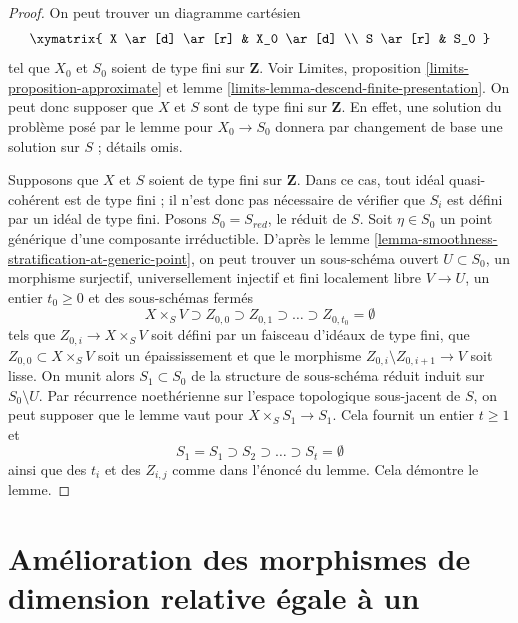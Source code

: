 \begin{proof}
On peut trouver un diagramme cartésien
$$
\xymatrix{
X \ar[d] \ar[r] & X_0 \ar[d] \\
S \ar[r] & S_0
}
$$
tel que $X_0$ et $S_0$ soient de type fini sur $\mathbf{Z}$. Voir
Limites, proposition \ref{limits-proposition-approximate} et
lemme \ref{limits-lemma-descend-finite-presentation}.
On peut donc supposer que $X$ et $S$ sont de type fini sur $\mathbf{Z}$.
En effet, une solution du problème posé par le lemme pour $X_0 \to S_0$
donnera par changement de base une solution sur $S$ ; détails omis.

\medskip\noindent
Supposons que $X$ et $S$ soient de type fini sur $\mathbf{Z}$.
Dans ce cas, tout idéal quasi-cohérent est de type fini ; il n'est donc
pas nécessaire de vérifier que $S_i$ est défini
par un idéal de type fini. Posons $S_0 = S_{red}$, le réduit de $S$.
Soit $\eta \in S_0$ un point générique d'une composante irréductible.
D'après le lemme \ref{lemma-smoothness-stratification-at-generic-point},
on peut trouver un sous-schéma ouvert $U \subset S_0$,
un morphisme surjectif, universellement injectif et fini localement libre
$V \to U$, un entier $t_0 \geq 0$ et des sous-schémas fermés
$$
X \times_S V \supset Z_{0, 0} \supset Z_{0, 1} \supset \ldots \supset
Z_{0, t_0} = \emptyset
$$
tels que $Z_{0, i} \to X \times_S V$ soit défini par un faisceau d'idéaux de type fini,
que $Z_{0, 0} \subset X \times_S V$ soit un épaississement et que le morphisme
$Z_{0, i} \setminus Z_{0, i + 1} \to V$ soit lisse.
On munit alors $S_1 \subset S_0$ de la structure de sous-schéma réduit induit
sur $S_0 \setminus U$. Par récurrence noethérienne sur l'espace
topologique sous-jacent de $S$, on peut supposer que le lemme vaut pour
$X \times_S S_1 \to S_1$. Cela fournit un entier $t \geq 1$ et
$$
S_1 = S_1 \supset S_2 \supset \ldots \supset S_t = \emptyset
$$
ainsi que des $t_i$ et des $Z_{i, j}$ comme dans l'énoncé du lemme.
Cela démontre le lemme.
\end{proof}


















\section{Amélioration des morphismes de dimension relative égale à un}
\label{section-make-good-curves}

